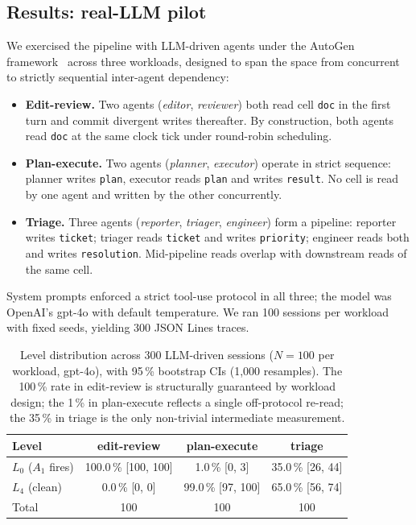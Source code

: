 \documentclass[journal,compsoc,10pt]{IEEEtran}
\theoremstyle{definition}
\theoremstyle{remark}
\begin{document}
\subsection{Results: real-LLM pilot}
\label{sec:real-llm-pilot}
We exercised the pipeline with LLM-driven agents under the AutoGen
framework~\cite{WuEtAl2023AutoGen} across three workloads, designed
to span the space from concurrent to strictly sequential
inter-agent dependency:

\begin{itemize}
    \item \textbf{Edit-review.} Two agents
    (\textit{editor}, \textit{reviewer}) both read cell \texttt{doc}
    in the first turn and commit divergent writes thereafter. By
    construction, both agents read \texttt{doc} at the same clock
    tick under round-robin scheduling.
    \item \textbf{Plan-execute.} Two agents
    (\textit{planner}, \textit{executor}) operate in strict
    sequence: planner writes \texttt{plan}, executor reads
    \texttt{plan} and writes \texttt{result}. No cell is read by
    one agent and written by the other concurrently.
    \item \textbf{Triage.} Three agents
    (\textit{reporter}, \textit{triager}, \textit{engineer}) form
    a pipeline: reporter writes \texttt{ticket}; triager reads
    \texttt{ticket} and writes \texttt{priority}; engineer reads
    both and writes \texttt{resolution}. Mid-pipeline reads
    overlap with downstream reads of the same cell.
\end{itemize}

System prompts enforced a strict tool-use protocol in all three;
the model was OpenAI's gpt-4o with default temperature. We ran
100 sessions per workload with fixed seeds, yielding 300 JSON
Lines traces.

\begin{table}[t]
\centering
\caption{Level distribution across 300 LLM-driven sessions
($N=100$ per workload, gpt-4o), with 95\,\% bootstrap CIs (1{,}000
resamples). The 100\,\% rate in edit-review is structurally
guaranteed by workload design; the 1\,\% in plan-execute reflects
a single off-protocol re-read; the 35\,\% in triage is the only
non-trivial intermediate measurement.}
\label{tab:real-pilot}
\begin{tabular}{@{}lccc@{}}
\toprule
Level & edit-review & plan-execute & triage \\
\midrule
$L_0$ ($A_1$ fires) & 100.0\,\% [100, 100] & 1.0\,\% [0, 3] & 35.0\,\% [26, 44] \\
$L_4$ (clean)       & 0.0\,\% [0, 0]       & 99.0\,\% [97, 100] & 65.0\,\% [56, 74] \\
\midrule
Total & 100 & 100 & 100 \\
\bottomrule
\end{tabular}
\end{table}
\end{document}

